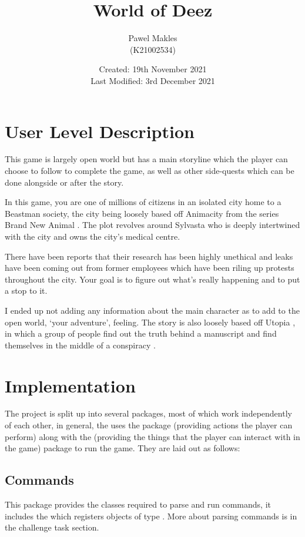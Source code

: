 \documentclass{article}
\title{World of Deez}
\author{Pawel Makles \\ \small (K21002534)}
\date{\small Created: 19th November 2021 \\ Last Modified: 3rd December 2021}
\begin{document}
\maketitle

    \begin{multicols}{2}
        \section{User Level Description}
        This game is largely open world but has a main storyline which the player can choose to follow to complete the game, as well as other side-quests which can be done alongside or after the story.

        In this game, you are one of millions of citizens in an isolated city home to a Beastman \cite{beastman} society, the city being loosely based off Animacity \cite{animacity} from the series Brand New Animal \cite{bna}. The plot revolves around Sylvasta who is deeply intertwined with the city and owns the city's medical centre.

        There have been reports that their research has been highly unethical and leaks have been coming out from former employees which have been riling up protests throughout the city. Your goal is to figure out what's really happening and to put a stop to it.

        I ended up not adding any information about the main character as to add to the open world, `your adventure', feeling. The story is also loosely based off Utopia \cite{utopia}, in which a group of people find out the truth behind a manuscript and find themselves in the middle of a conspiracy \cite{pyrocynical}.
        
        \section{Implementation}
        The project is split up into several packages, most of which work independently of each other, in general, the  uses the  package (providing actions the player can perform) along with the  (providing the things that the player can interact with in the game) package to run the game. They are laid out as follows:
        
            \subsection{Commands}
            This package provides the classes required to parse and run commands, it includes the  which registers objects of type . More about parsing commands is in the challenge task section.


\end{multicols}
\end{document}
